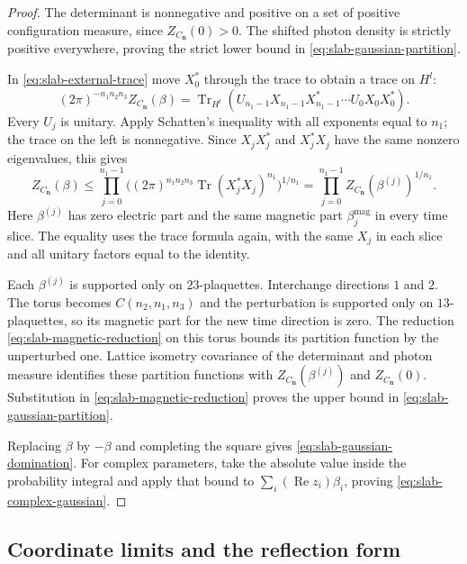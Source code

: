 \documentclass[11pt,letterpaper,reqno]{amsart}
\begin{document}
\begin{proof}
The determinant is nonnegative and positive on a set of positive
configuration measure, since $Z_{C_{\mathbf n}}(0)>0$. The shifted photon
density is strictly positive everywhere, proving the strict lower
bound in \eqref{eq:slab-gaussian-partition}.

In \eqref{eq:slab-external-trace} move $X_0^*$ through the trace to
obtain a trace on $H^l$:
\[
 (2\pi)^{-n_1n_2n_3}Z_{C_{\mathbf n}}(\beta)
       =\operatorname{Tr}_{H^l}
          (U_{n_1-1}X_{n_1-1}X_{n_1-1}^*\cdots U_0X_0X_0^*).
\]
Every $U_j$ is unitary. Apply Schatten's inequality with all exponents
equal to $n_1$; the trace on the left is nonnegative. Since $X_jX_j^*$
and $X_j^*X_j$ have the same nonzero eigenvalues, this gives
\begin{equation}\label{eq:slab-magnetic-reduction}
 Z_{C_{\mathbf n}}(\beta)
       \le\prod_{j=0}^{n_1-1}
            \bigl((2\pi)^{n_1n_2n_3}
                    \operatorname{Tr}(X_j^*X_j)^{n_1}\bigr)^{1/n_1}
       =\prod_{j=0}^{n_1-1}Z_{C_{\mathbf n}}(\beta^{(j)})^{1/n_1}.
\end{equation}
Here $\beta^{(j)}$ has zero electric part and the same magnetic
part $\beta_j^{\mathrm{mag}}$ in every time slice. The equality uses
the trace formula again, with the same $X_j$ in each slice and all
unitary factors equal to the identity.

Each $\beta^{(j)}$ is supported only on $23$-plaquettes. Interchange
directions $1$ and $2$. The torus becomes $C(n_2,n_1,n_3)$ and the
perturbation is supported only on $13$-plaquettes, so its magnetic
part for the new time direction is zero. The reduction
\eqref{eq:slab-magnetic-reduction} on this torus bounds its partition
function by the unperturbed one. Lattice isometry covariance of the
determinant and photon measure identifies these partition functions
with $Z_{C_{\mathbf n}}(\beta^{(j)})$ and $Z_{C_{\mathbf n}}(0)$. Substitution in
\eqref{eq:slab-magnetic-reduction} proves the upper bound in
\eqref{eq:slab-gaussian-partition}.

Replacing $\beta$ by $-\beta$ and completing the square gives
\eqref{eq:slab-gaussian-domination}. For complex parameters, take
the absolute value inside the probability integral and apply that
bound to $\sum_i(\operatorname{Re}z_i)\beta_i$, proving
\eqref{eq:slab-complex-gaussian}.
\end{proof}


\subsection{Coordinate limits and the reflection form}\label{subsec:coordinate-limits}
\end{document}
